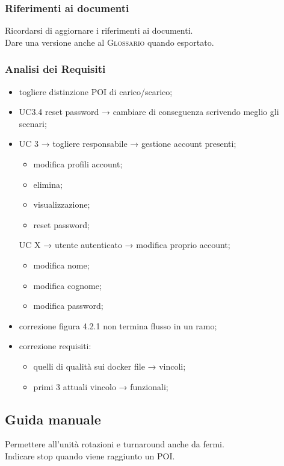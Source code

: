 \subsubsection{Riferimenti ai documenti}
Ricordarsi di aggiornare i riferimenti ai documenti.\\
Dare una versione anche al \textsc{Glossario} quando esportato.

\subsubsection{Analisi dei Requisiti}
\begin{itemize}
	\item togliere distinzione POI di carico/scarico;

	\item UC3.4 reset password → cambiare di conseguenza scrivendo meglio gli scenari;

	\item UC 3 → togliere responsabile → gestione account presenti;
	\begin{itemize}
		\item modifica profili account;

		\item elimina;

		\item visualizzazione;

		\item reset password;
	\end{itemize}
	UC X → utente autenticato → modifica proprio account;
	\begin{itemize}
		\item modifica nome;

		\item modifica cognome;

		\item modifica password;
	\end{itemize}
	\item correzione figura 4.2.1 non termina flusso in un ramo;

	\item correzione requisiti:
	\begin{itemize}
		\item quelli di qualità sui docker file → vincoli;
		\item primi 3 attuali vincolo → funzionali;
	\end{itemize}
\end{itemize}

\subsection{Guida manuale}
Permettere all'unità rotazioni e turnaround anche da fermi.\\
Indicare stop quando viene raggiunto un POI.


